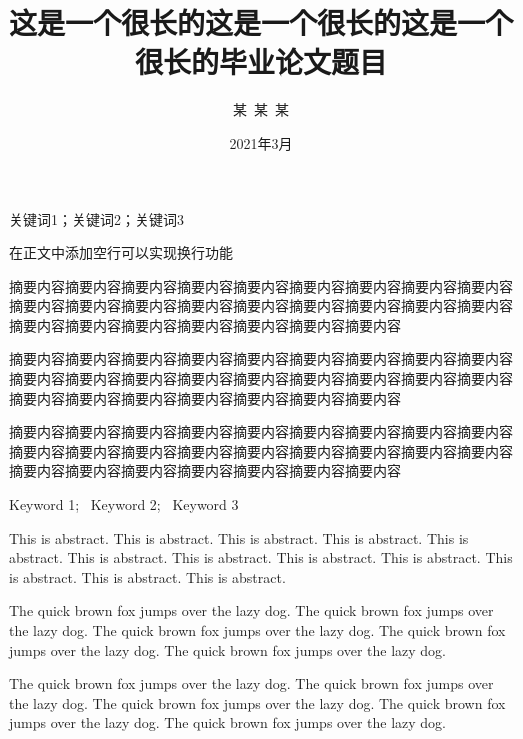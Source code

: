 \documentclass{shnuthesis}
\title{这是一个很长的这是一个很长的这是一个很长的毕业论文题目}
\author{某~某~某} %
\date{2021年3月}  %
\begin{document}
\frontmatter

\maketitle

%

\makestatement


\clearpage   %



\begin{cnabstract}{关键词1；关键词2；关键词3}

在正文中添加空行可以实现换行功能
		
摘要内容摘要内容摘要内容摘要内容摘要内容摘要内容摘要内容摘要内容摘要内容摘要内容摘要内容摘要内容摘要内容摘要内容摘要内容摘要内容摘要内容摘要内容摘要内容摘要内容摘要内容摘要内容摘要内容摘要内容摘要内容
		
摘要内容摘要内容摘要内容摘要内容摘要内容摘要内容摘要内容摘要内容摘要内容摘要内容摘要内容摘要内容摘要内容摘要内容摘要内容摘要内容摘要内容摘要内容摘要内容摘要内容摘要内容摘要内容摘要内容摘要内容摘要内容

摘要内容摘要内容摘要内容摘要内容摘要内容摘要内容摘要内容摘要内容摘要内容摘要内容摘要内容摘要内容摘要内容摘要内容摘要内容摘要内容摘要内容摘要内容摘要内容摘要内容摘要内容摘要内容摘要内容摘要内容摘要内容

\end{cnabstract}



\begin{enabstract}{Keyword 1;~ Keyword 2;~ Keyword 3}


This is abstract. This is abstract. This is abstract. This is abstract. This is abstract. This is abstract. This is abstract. This is abstract. This is abstract. This is abstract. This is abstract. This is abstract.
		
The quick brown fox jumps over the lazy dog. The quick brown fox jumps over the lazy dog. The quick brown fox jumps over the lazy dog. The quick brown fox jumps over the lazy dog. The quick brown fox jumps over the lazy dog.

The quick brown fox jumps over the lazy dog. The quick brown fox jumps over the lazy dog. The quick brown fox jumps over the lazy dog. The quick brown fox jumps over the lazy dog. The quick brown fox jumps over the lazy dog.

\end{enabstract}
	
\end{document}
